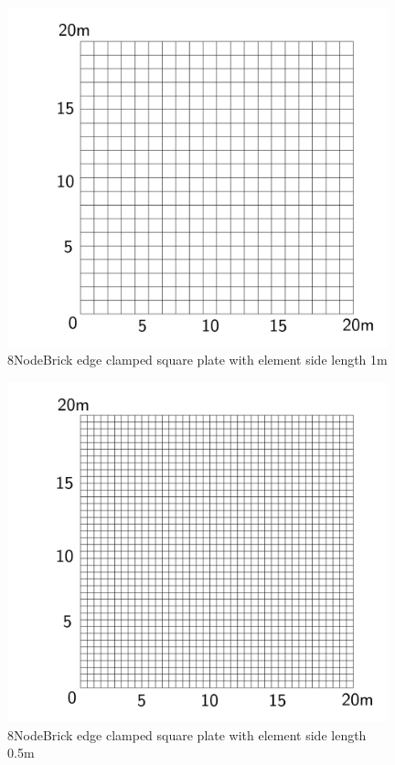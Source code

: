 \documentclass[fleqn,11pt]{article}
\begin{document}
\newpage

\begin{figure}[H]
  \centering
  \includegraphics[width=11cm]{../Figure-files/square_plate4.pdf}
  \caption{8NodeBrick edge clamped square plate with element side length 1m }
  \label{fig 8NodeBrick edges clamped square plate with element side length 1m }
\end{figure}


\begin{figure}[H]
  \centering
  \includegraphics[width=11cm]{../Figure-files/square_plate5.pdf}
  \caption{8NodeBrick edge clamped square plate with element side length 0.5m }
  \label{fig 8NodeBrick edges clamped square plate with element side length 0.5m }
\end{figure}
\end{document}
